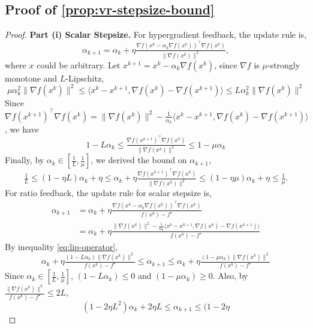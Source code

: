 \documentclass{article}
\theoremstyle{definition}
\begin{document}
\subsection{Proof of \cref{prop:vr-stepsize-bound}}
\begin{proof}
  \textbf{Part (i) Scalar Stepsize.} For hypergradient feedback, the update rule is,
  \[ \alpha_{k + 1} = \alpha_k + \eta \tfrac{\nabla f (x^k - \alpha_k \nabla f
     (x^k))^{\top} \nabla f (x^k)}{\| \nabla f (x^k) \|^2}, \]
  where $x$ could be arbitrary. Let $x^{k+1} = x^k - \alpha_k \nabla f (x^k)$, since
  $\nabla f$ is $\mu$-strongly monotone and $L$-Lipschitz,
  \begin{equation}
    \mu \alpha_k^2 \| \nabla f (x^k) \|^2 \leq \langle x^k - x^{k+1}, \nabla f (x^k) -
    \nabla f (x^{k+1}) \rangle \leq L \alpha_k^2 \| \nabla f (x^k) \|^2
    \label{eq:lip-operator}
  \end{equation}
  Since $\nabla f (x^{k+1})^{\top} \nabla f (x^k) = \| \nabla f (x^k) \|^2 -
  \frac{1}{\alpha_k} \langle x^k - x^{k+1}, \nabla f (x^k) - \nabla f (x^{k+1}) \rangle$,
  we have
  \[ 1 - L \alpha_k \leq \tfrac{\nabla f (x^{k+1})^{\top} \nabla f (x^k)}{\| \nabla
     f (x^k) \|^2} \leq 1 - \mu \alpha_k \]
  Finally, by $\alpha_k \in \left[ \tfrac{1}{L}, \tfrac{1}{\mu} \right]$, we
  derived the bound on $\alpha_{k + 1}$,
  \[ \tfrac{1}{L} \leq (1 - \eta L) \alpha_k + \eta \leq \alpha_k + \eta
     \tfrac{\nabla f (x^{k+1})^{\top} \nabla f (x^k)}{\| \nabla f (x^k) \|^2} \leq (1
     - \eta \mu) \alpha_k + \eta \leq \tfrac{1}{\mu} . \]
  For ratio feedback, the update rule for scalar stepsize is,
  \begin{align*}
    \alpha_{k + 1} &{}= \alpha_k + \eta \tfrac{\nabla f (x^k - \alpha_k \nabla
    f (x^k))^{\top} \nabla f (x^k)}{f (x^k) - f^{\star}}\\
    &{}= \alpha_k + \eta \tfrac{\| \nabla f (x^k) \|^2 - \frac{1}{\alpha_k}
    \langle x^k - x^{k+1}, \nabla f (x^k) - \nabla f (x^{k+1}) \rangle}{f (x^k) - f^{\star}}
  \end{align*}
  By inequality \eqref{eq:lip-operator},
  \[ \alpha_k + \eta \tfrac{(1 - L \alpha_k) \| \nabla f (x^k) \|^2}{f (x^k) -
     f^{\star}} \leq \alpha_{k + 1} \leq \alpha_k + \eta \tfrac{(1 - \mu
     \alpha_k) \| \nabla f (x^k) \|^2}{f (x^k) - f^{\star}} \]
  Since $\alpha_k \in \left[ \frac{1}{L}, \frac{1}{\mu} \right]$, $(1 - L
  \alpha_k) \leq 0$ and $(1 - \mu \alpha_k) \geq 0$. Also, by $\tfrac{\|
  \nabla f (x^k) \|^2}{f (x^k) - f^{\star}} \leq 2 L$,
  \[ (1 - 2 \eta L^2) \alpha_k + 2 \eta L \leq \alpha_{k + 1} \leq (1 - 2 \eta
\]
\end{proof}
\end{document}
